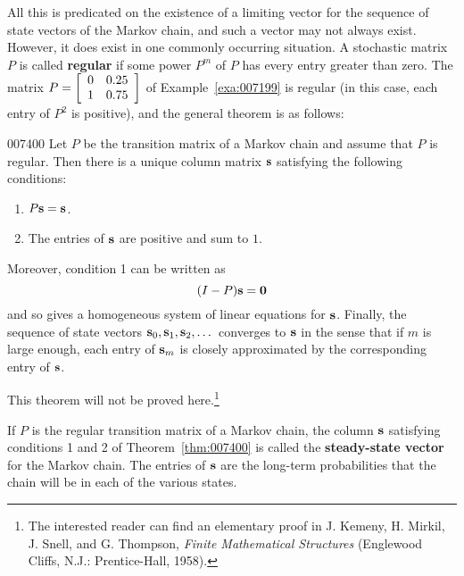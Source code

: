 All this is predicated on the existence of a limiting vector for the sequence of state vectors of the Markov chain, and such a vector may not always exist. However, it does exist in one commonly occurring situation. A stochastic matrix $P$ is called \textbf{regular} if some power $P^{m}$ of $P$ has every entry greater than zero. The matrix $P = \left[ \begin{array}{rr}
 0 & 0.25 \\
 1 & 0.75
 \end{array} \right]$
 of Example~\ref{exa:007199} is regular (in this case, each entry of $P^{2}$ is positive), and the general theorem is as follows:


\begin{theorem}{}{007400}
Let $P$ be the transition matrix of a Markov chain and assume that $P$ is regular. Then there is a unique column matrix $\textbf{s}$ satisfying the following conditions:


\begin{enumerate}
\item $P\textbf{s} = \textbf{s}$.

\item The entries of $\textbf{s}$ are positive and sum to $1$.

\end{enumerate}

Moreover, condition 1 can be written as
\begin{equation*}
(I - P)\textbf{s} = \textbf{0}
\end{equation*}
and so gives a homogeneous system of linear equations for $\textbf{s}$. Finally, the sequence of state vectors $\textbf{s}_{0}, \textbf{s}_{1}, \textbf{s}_{2}, \dots$ converges to $\textbf{s}$ in the sense that if $m$ is large enough, each entry of $\textbf{s}_{m}$ is closely approximated by the corresponding entry of $\textbf{s}$.
\end{theorem}

\noindent This theorem will not be proved here.\footnote{The interested reader can find an elementary proof in J. Kemeny, H. Mirkil, J. Snell, and G. Thompson, \textit{Finite Mathematical Structures} (Englewood Cliffs, N.J.: Prentice-Hall, 1958).}

If $P$ is the regular transition matrix of a Markov chain, the column $\textbf{s}$ satisfying conditions 1 and 2 of Theorem~\ref{thm:007400} is called the \textbf{steady-state vector} for the Markov chain. The entries of $\textbf{s}$ are the long-term probabilities that the chain will be in each of the various states.


